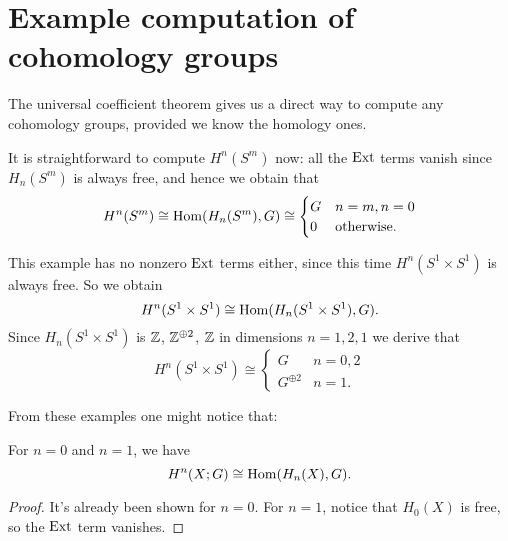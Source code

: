 \section{Example computation of cohomology groups}

The universal coefficient theorem gives us a direct way to compute
any cohomology groups, provided we know the homology ones.

\begin{example}
	It is straightforward to compute $H^n(S^m)$ now:
	all the $\operatorname{Ext}$ terms vanish since $H_n(S^m)$ is always free,
	and hence we obtain that
	\[ H^n(S^m) \cong \operatorname{Hom}(H_n(S^m), G) \cong
		\begin{cases}
			G & n=m, n=0 \\
			0 & \text{otherwise}.
		\end{cases}
	\]
\end{example}

\begin{example}
	This example has no nonzero $\operatorname{Ext}$ terms either,
	since this time $H^n(S^1 \times S^1)$ is always free.
	So we obtain
	\[ H^n(S^1 \times S^1) \cong \operatorname{Hom}(H_n(S^1 \times S^1), G). \]
	Since $H_n(S^1 \times S^1)$ is $\mathbb Z$, $\mathbb Z^{\oplus 2}$, $\mathbb Z$
	in dimensions $n=1,2,1$ we derive that
	\[
		H^n(S^1 \times S^1)
		\cong
		\begin{cases}
			G & n = 0,2 \\
			G^{\oplus 2} & n = 1.
		\end{cases}
	\]
\end{example}

From these examples one might notice that:
\begin{lemma}
	For $n = 0$ and $n = 1$, we have
	\[ H^n(X;G) \cong \operatorname{Hom}(H_n(X), G). \]
\end{lemma}
\begin{proof}
	It's already been shown for $n=0$.
	For $n=1$, notice that $H_0(X)$ is free,
	so the $\operatorname{Ext}$ term vanishes.
\end{proof}

